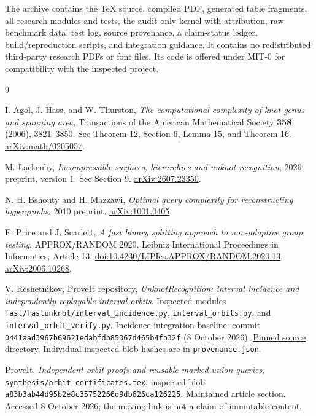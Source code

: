 \documentclass[11pt]{article}
\theoremstyle{definition}
\begin{document}
The archive contains the TeX source, compiled PDF, generated table fragments,
all research modules and tests, the audit-only kernel with attribution,
raw benchmark data, test log, source provenance, a claim-status ledger,
build/reproduction scripts, and integration guidance. It contains no
redistributed third-party research PDFs or font files. Its code is offered
under MIT-0 for compatibility with the inspected project.

\clearpage
\begin{thebibliography}{9}
\raggedright
{}
I. Agol, J. Hass, and W. Thurston,
\emph{The computational complexity of knot genus and spanning area},
Transactions of the American Mathematical Society \textbf{358} (2006),
3821--3850. See Theorem 12, Section 6, Lemma 15, and Theorem 16.
\href{https://arxiv.org/abs/math/0205057}{arXiv:math/0205057}.

M. Lackenby,
\emph{Incompressible surfaces, hierarchies and unknot recognition},
2026 preprint, version 1. See Section 9.
\href{https://arxiv.org/abs/2607.23350}{arXiv:2607.23350}.

N. H. Bshouty and H. Mazzawi,
\emph{Optimal query complexity for reconstructing hypergraphs},
2010 preprint.
\href{https://arxiv.org/abs/1001.0405}{arXiv:1001.0405}.

E. Price and J. Scarlett,
\emph{A fast binary splitting approach to non-adaptive group testing},
APPROX/RANDOM 2020, Leibniz International Proceedings in Informatics,
Article 13.
\href{https://doi.org/10.4230/LIPIcs.APPROX/RANDOM.2020.13}{doi:10.4230/LIPIcs.APPROX/RANDOM.2020.13}.
\href{https://arxiv.org/abs/2006.10268}{arXiv:2006.10268}.

V. Reshetnikov, ProveIt repository,
\emph{UnknotRecognition: interval incidence and independently replayable
interval orbits}. Inspected modules
\texttt{fast/fastunknot/interval\_incidence.py},
\texttt{interval\_orbits.py}, and \texttt{interval\_orbit\_verify.py}.
Incidence integration baseline: commit
\texttt{0441aad3967b69621edabfdb85367d465b4fb32f} (8 October 2026).
\href{https://github.com/VladimirReshetnikov/ProveIt/tree/0441aad3967b69621edabfdb85367d465b4fb32f/Topology/UnknotRecognition}{Pinned source directory}.
Individual inspected blob hashes are in \texttt{provenance.json}.

ProveIt, \emph{Independent orbit proofs and reusable marked-union queries},
\texttt{synthesis/orbit\_certificates.tex}, inspected blob
\texttt{a83b3ab44d95b2e8c35752266d9db626ca126225}.
\href{https://github.com/VladimirReshetnikov/ProveIt/blob/main/Topology/UnknotRecognition/synthesis/orbit_certificates.tex}{Maintained article section}.
Accessed 8 October 2026; the moving link is not a claim of immutable content.
\end{thebibliography}
\end{document}
